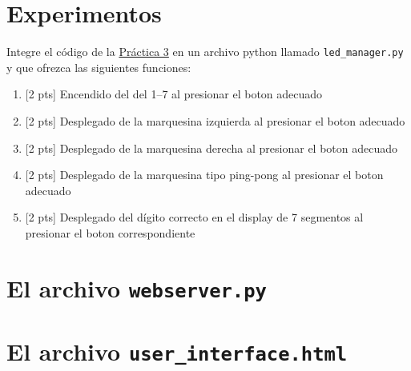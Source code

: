 \documentclass[letterpaper,10.5pt]{article}
\newcommand{\prevpract}{%
	\href{https://github.com/kyordhel/FSEm/tree/master/practica03}{Práctica 3}%
	\xspace{}%
}
\begin{document}
\section{Experimentos}%
\label{sec:experiments}

Integre el código de la \prevpract{} en un archivo python llamado \texttt{led\_manager.py} y que ofrezca las siguientes funciones:
\begin{enumerate}
	\item{} [2 pts] Encendido del del 1--7 al presionar el boton adecuado
	\item{} [2 pts] Desplegado de la marquesina izquierda al presionar el boton adecuado
	\item{} [2 pts] Desplegado de la marquesina derecha al presionar el boton adecuado
	\item{} [2 pts] Desplegado de la marquesina tipo ping-pong al presionar el boton adecuado
	\item{} [2 pts] Desplegado del dígito correcto en el display de 7 segmentos al presionar el boton correspondiente
\end{enumerate}



\cleardoublepage
\appendix
\section{El archivo \texttt{webserver.py}}%
\label{sec:webserver-py}
\setlength{\columnsep}{1cm}
\begin{multicols}{2}

\end{multicols}

\section{El archivo \texttt{user\_interface.html}}%
\label{sec:ui-html}
\setlength{\columnsep}{1cm}
\begin{multicols}{2}

\end{multicols}
\end{document}
